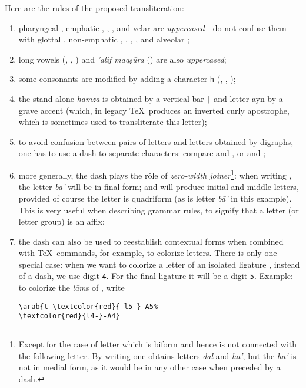\documentclass[11pt,a4paper]{article}
\def\hamza{'}%
\begin{document}
Here are the rules of the proposed transliteration: 
\begin{enumerate}
\item pharyngeal , emphatic , , ,
 and velar  are \emph{uppercased}---do not confuse them with glottal , non-emphatic , , , , and alveolar ;
\item long vowels (, , ) and
\emph{\hamza$\!$alif maq\d s\=ura} () are also
\emph{uppercased};

\item some consonants are modified by adding a character \texttt{h} (, , );

\item the stand-alone \emph{hamza} is obtained by a vertical bar \texttt{|} and letter ayn by a grave accent (which, in legacy \TeX\ produces an inverted curly apostrophe, which is sometimes used to transliterate this letter);

\item to avoid confusion between pairs of letters and letters obtained by digraphs, one has to use a dash to separate characters: compare  and , or  and ;

\item more generally, the dash plays the r\^ole of \emph{zero-width joiner}\footnote{Except for the case of letter  which is biform and hence is not connected with the following letter. By writing  one obtains letters \emph{d\=al} and \emph{h\=a\hamza}, but the \emph{h\=a\hamza} is not in medial form, as it would be in any other case when preceded by a dash.}: when writing , the letter \emph{b\=a\hamza} will be in final form;  and  will produce initial and middle letters, provided of course the letter is quadriform (as is letter \emph{b\=a\hamza} in this example). This is very useful when describing grammar rules, to signify that a letter (or letter group) is an affix;

\item the dash can also be used to reestablish contextual forms when combined with \TeX\ commands, for example, to colorize letters. There is only one special case: when we want to colorize a letter of an isolated ligature , instead of a dash, we use digit \texttt{4}. For the final ligature  it will be a digit \texttt{5}. Example: to colorize the \emph{l\=am}s of , write
\begin{verbatim}
\arab{t-\textcolor{red}{-l5-}-A5%
\textcolor{red}{l4-}-A4}
\end{verbatim}


\end{enumerate}
\end{document}
